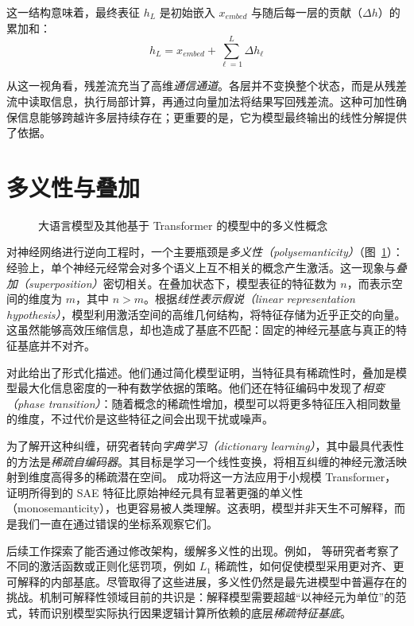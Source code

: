 这一结构意味着，最终表征 $h_L$ 是初始嵌入 $x_{embed}$ 与随后每一层的贡献（$\Delta h$）的累加和：
\begin{equation}
    h_L = x_{embed} + \sum_{\ell=1}^{L} \Delta h_\ell
\end{equation}

从这一视角看，残差流充当了高维\emph{通信通道}。各层并不变换整个状态，而是从残差流中读取信息，执行局部计算，再通过向量加法将结果写回残差流。这种可加性确保信息能够跨越许多层持续存在；更重要的是，它为模型最终输出的线性分解提供了依据。


\section{多义性与叠加}

\begin{figure}[!ht]
  \begin{center}
    
    \caption{大语言模型及其他基于 Transformer 的模型中的多义性概念\label{fig:polysemanticity}}
  \end{center}
\end{figure}

对神经网络进行逆向工程时，一个主要瓶颈是\emph{多义性（polysemanticity）}（图~\ref{fig:polysemanticity}）：经验上，单个神经元经常会对多个语义上互不相关的概念产生激活。这一现象与\emph{叠加（superposition）}密切相关。在叠加状态下，模型表征的特征数为 $n$，而表示空间的维度为 $m$，其中 $n > m$。根据\emph{线性表示假说（linear representation hypothesis）}，模型利用激活空间的高维几何结构，将特征存储为近乎正交的向量。这虽然能够高效压缩信息，却也造成了基底不匹配：固定的神经元基底与真正的特征基底并不对齐。

\citet{elhage2022toy} 对此给出了形式化描述。他们通过简化模型证明，当特征具有稀疏性时，叠加是模型最大化信息密度的一种有数学依据的策略。他们还在特征编码中发现了\emph{相变（phase transition）}：随着概念的稀疏性增加，模型可以将更多特征压入相同数量的维度，不过代价是这些特征之间会出现干扰或噪声。

为了解开这种纠缠，研究者转向\emph{字典学习（dictionary learning）}，其中最具代表性的方法是\emph{稀疏自编码器}。其目标是学习一个线性变换，将相互纠缠的神经元激活映射到维度高得多的稀疏潜在空间。\citet{bricken2023monosemanticity} 成功将这一方法应用于小规模 Transformer，证明所得到的 SAE 特征比原始神经元具有显著更强的单义性（monosemanticity），也更容易被人类理解。这表明，模型并非天生不可解释，而是我们一直在通过错误的坐标系观察它们。

后续工作探索了能否通过修改架构，缓解多义性的出现。例如，\citet{liu2023seeing} 等研究者考察了不同的激活函数或正则化惩罚项，例如 $L_1$ 稀疏性，如何促使模型采用更对齐、更可解释的内部基底。尽管取得了这些进展，多义性仍然是最先进模型中普遍存在的挑战。机制可解释性领域目前的共识是：解释模型需要超越“以神经元为单位”的范式，转而识别模型实际执行因果逻辑计算所依赖的底层\emph{稀疏特征基底}。




